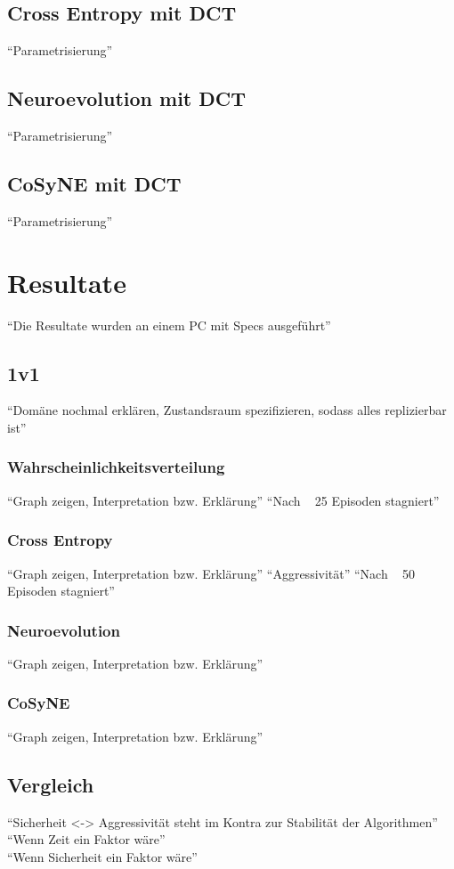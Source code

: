         \subsection{Cross Entropy mit DCT}
            ``Parametrisierung''
        \subsection{Neuroevolution mit DCT}
            ``Parametrisierung''
        \subsection{CoSyNE mit DCT}
            ``Parametrisierung''

    \section{Resultate}
        ``Die Resultate wurden an einem PC mit Specs ausgeführt''
        \subsection{1v1}
            ``Domäne nochmal erklären, Zustandsraum spezifizieren, sodass alles replizierbar ist''
            \subsubsection*{Wahrscheinlichkeitsverteilung}
                ``Graph zeigen, Interpretation bzw. Erklärung''
                ``Nach ~ 25 Episoden stagniert''
            \subsubsection*{Cross Entropy}
                ``Graph zeigen, Interpretation bzw. Erklärung''
                ``Aggressivität''
                ``Nach ~ 50 Episoden stagniert''
            \subsubsection*{Neuroevolution}
                ``Graph zeigen, Interpretation bzw. Erklärung''
            \subsubsection*{CoSyNE}
                ``Graph zeigen, Interpretation bzw. Erklärung''
        \subsection{Vergleich}
            ``Sicherheit <-> Aggressivität steht im Kontra zur Stabilität der Algorithmen''\\
            ``Wenn Zeit ein Faktor wäre'' \\
            ``Wenn Sicherheit ein Faktor wäre'' \\


